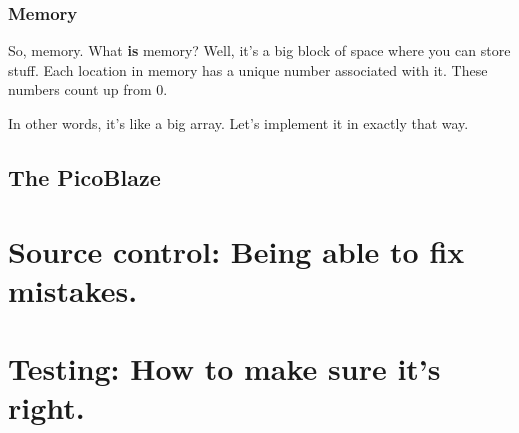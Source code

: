 \documentclass[12pt,a4paper]{article}
\begin{document}


\pagebreak
\subsubsection{Memory}

So, memory. What \textbf{is} memory? Well, it's a big block of space
where you can store stuff. Each location in memory has a unique number
associated with it. These numbers count up from 0.

In other words, it's like a big array. Let's implement it in exactly
that way.



\pagebreak
\subsection{The PicoBlaze}

\pagebreak
\section{Source control: Being able to fix mistakes.}

\pagebreak
\section{Testing: How to make sure it's right.}
\end{document}
